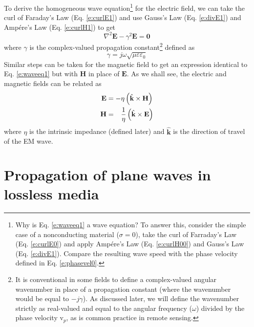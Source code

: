 \documentclass[11pt, oneside]{article}
\begin{document}
To derive the homogeneous wave equation\footnote{Why is Eq. \ref{e:waveeq1} a wave equation? To answer this, consider the simple case of a nonconducting material ($\sigma=0$), take the curl of Farraday's Law (Eq. \ref{e:curlE0}) and apply Amp\'{e}re's Law (Eq. \ref{e:curlH00}) and Gauss's Law (Eq. \ref{e:divE1}). Compare the resulting wave speed with the phase velocity defined in Eq. \ref{e:phasevel0}.} for the electric field, we can take the curl of Faraday's Law (Eq. \ref{e:curlE1}) and use Gauss's Law (Eq. \ref{e:divE1}) and Amp\'{e}re's Law (Eq. \ref{e:curlH1}) to get
	\begin{equation}
	\label{e:waveeq1}
	\nabla^2\mathbf{E} - \gamma^2\mathbf{E} = \mathbf{0}
	\end{equation}
where $\gamma$ is the complex-valued propagation constant\footnote{It is conventional in some fields to define a complex-valued angular wavenumber in place of a propagation constant (where the wavenumber would be equal to $-j\gamma$). As discussed later, we will define the wavenumber strictly as real-valued and equal to the angular frequency ($\omega$) divided by the phase velocity $\mathrm{v}_p$, as is common practice in remote sensing. } defined as
	\begin{equation}
	\gamma = j\omega\sqrt{\mu\varepsilon\varepsilon_0}
	\end{equation}
Similar steps can be taken for the magnetic field to get an expression identical to Eq. \ref{e:waveeq1} but with $\mathbf{H}$ in place of $\mathbf{E}$. As we shall see, the electric and magnetic fields can be related as
	\begin{subequations}
	\label{e:maxwell3}
	\begin{align}
	\mathbf{E} &=  -\eta\left(\hat{\mathbf{k}}\times\mathbf{H}\right) \\
	\mathbf{H} &= \hphantom{-} \frac{1}{\eta}\left( \hat{\mathbf{k}}\times\mathbf{E}\right)
	\end{align}
	\end{subequations}
where $\eta$ is the intrinsic impedance (defined later) and $\hat{\mathbf{k}}$ is the direction of travel of the EM wave. 

\section{Propagation of plane waves in lossless media}
\end{document}
